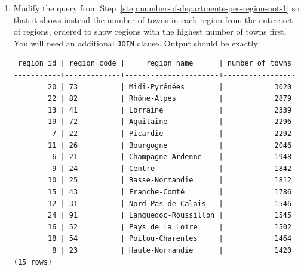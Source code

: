 \documentclass{pgnotes}
\begin{document}
\begin{enumerate}
\item
  Modify the query from Step~\ref{step:number-of-departments-per-region-not-1} so that it shows instead the number of towns in each region from the entire set of regions, ordered to show regions with the highest number of towns first.
  You will need an additional \texttt{JOIN} clause.
  Output should be exactly: 
\begin{verbatim}
 region_id | region_code |     region_name      | number_of_towns
-----------+-------------+----------------------+-----------------
        20 | 73          | Midi-Pyrénées        |            3020
        22 | 82          | Rhône-Alpes          |            2879
        13 | 41          | Lorraine             |            2339
        19 | 72          | Aquitaine            |            2296
         7 | 22          | Picardie             |            2292
        11 | 26          | Bourgogne            |            2046
         6 | 21          | Champagne-Ardenne    |            1948
         9 | 24          | Centre               |            1842
        10 | 25          | Basse-Normandie      |            1812
        15 | 43          | Franche-Comté        |            1786
        12 | 31          | Nord-Pas-de-Calais   |            1546
        24 | 91          | Languedoc-Roussillon |            1545
        16 | 52          | Pays de la Loire     |            1502
        18 | 54          | Poitou-Charentes     |            1464
         8 | 23          | Haute-Normandie      |            1420
(15 rows)
\end{verbatim}
  
\end{enumerate}
\end{document}
